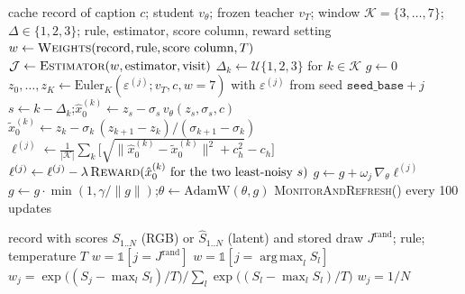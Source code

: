 \documentclass[11pt,a4paper]{article}
\DeclareMathOperator*{\argmax}{arg\,max}
\begin{document}
\begin{algorithm}[H]
\caption{One training update (all arms)}
\label{alg:update}
\begin{algorithmic}[1]
\Require cache record of caption $c$; student $v_\theta$; frozen teacher $v_T$; window $\mathcal{K}=\{3,\dots,7\}$; $\Delta\in\{1,2,3\}$; rule, estimator, score column, reward setting
\State $w\gets\textsc{Weights}(\text{record},\text{rule},\text{score column},T)$ 
\State $\mathcal{J}\gets\textsc{Estimator}(w,\text{estimator},\text{visit})$ 
\State $\Delta_k\gets\mathcal{U}\{1,2,3\}$ for $k\in\mathcal{K}$ 
\State $g\gets0$
  \State $z_0,\dots,z_K\gets\mathrm{Euler}_K(\varepsilon^{(j)};v_T,c,w{=}7)$ with $\varepsilon^{(j)}$ from seed $\texttt{seed\_base}+j$ 
   
    \State $s\gets k-\Delta_k$;\quad $\hat{x}_0^{(k)}\gets z_s-\sigma_s\,v_\theta(z_s,\sigma_s,c)$ 
    \State $\tilde{x}_0^{(k)}\gets z_k-\sigma_k\,(z_{k+1}-z_k)/(\sigma_{k+1}-\sigma_k)$ 
  \EndFor
  \State $\ell^{(j)}\gets\frac{1}{|\mathcal{K}|}\sum_{k}\big[\sqrt{\lVert\hat{x}_0^{(k)}-\tilde{x}_0^{(k)}\rVert^2+c_h^2}-c_h\big]$ 
   $\ell^{(j)}\gets\ell^{(j)}-\lambda\,\textsc{Reward}(\hat{x}_0^{(k)}\text{ for the two least-noisy }s)$  \EndIf
  \State $g\gets g+\omega_j\,\nabla_\theta\ell^{(j)}$ 
\EndFor
\State $g\gets g\cdot\min(1,\gamma/\lVert g\rVert)$;\quad $\theta\gets\mathrm{AdamW}(\theta,g)$ 
 \textsc{MonitorAndRefresh}() every 100 updates  \EndIf
\end{algorithmic}
\end{algorithm}

\begin{algorithm}[H]
\caption{\textsc{Weights}: the selection rule}
\label{alg:weights}
\begin{algorithmic}[1]
\Require record with scores $S_{1..N}$ (RGB) or $\hat S_{1..N}$ (latent) and stored draw $J^{\mathrm{rand}}$; rule; temperature $T$
 \Return $w=\mathbb{1}[j=J^{\mathrm{rand}}]$
 \Return $w=\mathbb{1}[j=\argmax_l S_l]$
 \Return $w_j=\exp\big((S_j-\max_lS_l)/T\big)\big/\sum_l\exp\big((S_l-\max_lS_l)/T\big)$ 
 \Return $w_j=1/N$
\EndIf
\end{algorithmic}
\end{algorithm}
\end{document}
